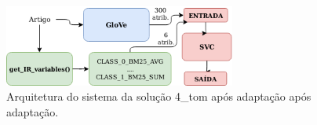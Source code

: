 \begin{figure}[h]
    \centering
    \caption{Arquitetura do sistema da solução 4\_tom após adaptação após adaptação.}
    \begin{center}
        \includegraphics[width=0.68\textwidth]{img/4-tom-arquitetura-com-ri.png}
    \end{center}
    \vspace{-0.5cm}
    \label{fig:4-tom-arquitetura-com-ri}
\end{figure}